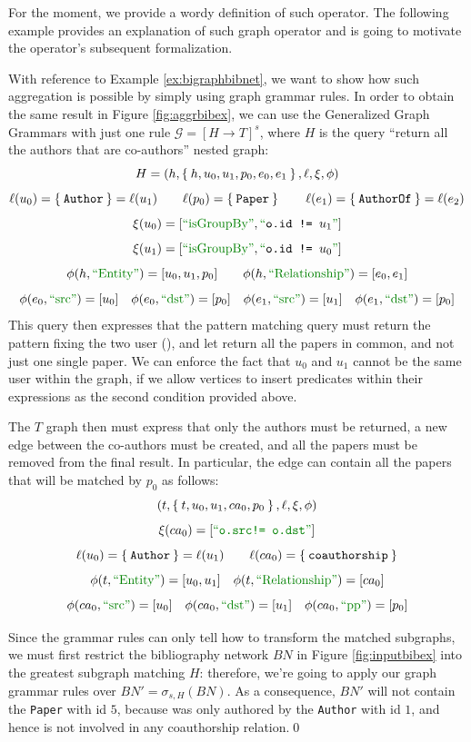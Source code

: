 For the moment, we provide a wordy definition of such operator. The following example provides an explanation of such graph operator and is going to motivate the operator's subsequent formalization.


\begin{example}[label=ex:firstforgrammars]
	With reference to Example \vref{ex:bigraphbibnet}, we want to show how such aggregation is possible by simply using graph grammar rules.	In order to obtain the same result in Figure \vref{fig:aggrbibex}, we can use the Generalized Graph Grammars with just one rule $\mathcal{G}=[H\to T]^s$, where $H$ is the query ``return all the authors that are co-authors'' nested graph:
	\[H=(h,\Set{h,u_0,u_1,p_0,e_0,e_1},\ell,\xi,\phi)\]
	\[\ell(u_0)=\Set{\texttt{Author}}=\ell(u_1)\qquad \ell(p_0)=\Set{\texttt{Paper}}\qquad \ell(e_1)=\Set{\texttt{AuthorOf}}=\ell(e_2)\]
	\[\xi(u_0)=[\mstr{isGroupBy},\textup{\color{webgreen}``}\texttt{o.id != }u_1\textup{\color{webgreen}''}]\]
	\[\xi(u_1)=[\mstr{isGroupBy},\textup{\color{webgreen}``}\texttt{o.id != }u_0\textup{\color{webgreen}''}]\]
	\[\phi(h,\ONTA)=[u_0, u_1, p_0]\qquad \phi(h,\RELA)=[e_0, e_1]\]
	\[\phi(e_0,\SRC)=[u_0]\quad \phi(e_0,\DST)=[p_0]\quad \phi(e_1,\SRC)=[u_1]\quad \phi(e_1,\DST)=[p_0]\]
	This query then expresses that the pattern matching query must return the pattern fixing the two user (), and let return all the papers in common, and not just one single paper. We can enforce the fact that $u_0$ and $u_1$ cannot be the same user within the graph, if we allow vertices to insert predicates within their expressions as the second condition provided above.
	
	 The $T$ graph then must express that only the authors must be returned, a new edge between the co-authors must be created, and all the papers must be removed from the final result. In particular, the edge can contain all the papers that will be matched by $p_0$ as follows:
	\[(t,\Set{t,u_0,u_1,ca_0,p_0},\ell,\xi,\phi)\]
	\[\xi(ca_0)=[{\color{webgreen}\textup{``}\texttt{o.src!= o.dst}\textup{''}}]\]
	\[\ell(u_0)=\Set{\texttt{Author}}=\ell(u_1)\qquad \ell(ca_0)=\Set{\texttt{coauthorship}}\]
	\[\phi(t,\ONTA)=[u_0,u_1]\quad \phi(t,\RELA)=[ca_0]\]
	\[\phi(ca_0,\SRC)=[u_0]\quad \phi(ca_0,\DST)=[u_1]\quad \phi(ca_0,\mstr{pp})=[p_0]\]
	
	Since the grammar rules can only tell how to transform the matched subgraphs, we must first restrict the bibliography network $BN$ in Figure \vref{fig:inputbibex} into the greatest subgraph matching $H$: therefore, we're going to apply our graph grammar rules over $BN'=\sigma_{s,H}(BN)$. As a consequence, $BN'$ will not contain the \texttt{Paper} with id $5$, because was only authored by the \texttt{Author} with id $1$, and hence is not involved in any coauthorship relation.\qed
\end{example}

